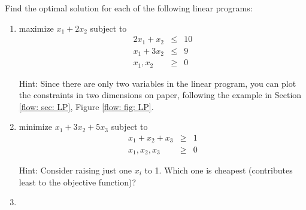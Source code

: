\documentclass[11pt]{article}
\begin{document}
{\small
  
Find the optimal solution for each of the following linear programs:

\begin{enumerate}[label=(\alph*)]
\item
  
  \parbox[t]{3in}{
    maximize $x_1 + 2x_2$ subject to
    \begin{eqnarray*}
      2x_1 + x_2 & \le & 10
      \\
      x_1 + 3x_2 & \le & 9
      \\
      x_1,x_2 & \ge & 0
    \end{eqnarray*}
  }\parbox[t]{3in}{
    Hint: Since there are only two variables in the linear program, 
    you can plot the constraints in two dimensions on paper,
    following the example in Section \ref{flow: sec: LP}, Figure \ref{flow: fig: LP}.
  }

\item

  \parbox[t]{3in}{
    minimize $x_1 + 3x_2 + 5 x_3$ subject to
    \begin{eqnarray*}
      x_1 + x_2 + x_3 & \ge & 1
      \\
      x_1,x_2,x_3 & \ge & 0
    \end{eqnarray*}
  }\parbox[t]{3in}{
    Hint: Consider raising just one $x_i$ to 1.  
    Which one is cheapest (contributes least to the objective function)?}

\item
  
\end{enumerate}
}
\end{document}
